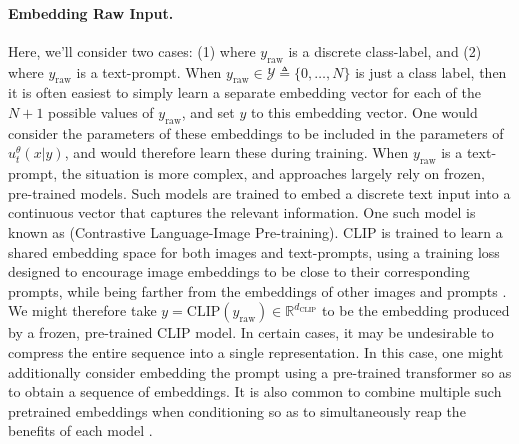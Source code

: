 \paragraph{Embedding Raw Input.} Here, we'll consider two cases: (1) where $y_{\text{raw}}$ is a discrete class-label, and (2) where $y_{\text{raw}}$ is a text-prompt. When $y_{\text{raw}} \in \mathcal{Y} \triangleq \{0,\dots, N\}$ is just a class label, then it is often easiest to simply learn a separate embedding vector for each of the $N+1$ possible values of $y_{\text{raw}}$, and set $y$ to this embedding vector. One would consider the parameters of these embeddings to be included in the parameters of $u_t^\theta(x|y)$, and would therefore learn these during training. When $y_{\text{raw}}$ is a text-prompt, the situation is more complex, and approaches largely rely on frozen, pre-trained models. Such models are trained to embed a discrete text input into a continuous vector that captures the relevant information. One such model is known as  (Contrastive Language-Image Pre-training). CLIP is trained to learn a shared embedding space for both images and text-prompts, using a training loss designed to encourage image embeddings to be close to their corresponding prompts, while being farther from the embeddings of other images and prompts \cite{clip}. We might therefore take $y = \text{CLIP}(y_{\text{raw}}) \in \mathbb{R}^{d_{\text{CLIP}}}$ to be the embedding produced by a frozen, pre-trained CLIP model. In certain cases, it may be undesirable to compress the entire sequence into a single representation. In this case, one might additionally consider embedding the prompt using a pre-trained transformer so as to obtain a sequence of embeddings. It is also common to combine multiple such pretrained embeddings when conditioning so as to simultaneously reap the benefits of each model \cite{sd3, moviegen}.

